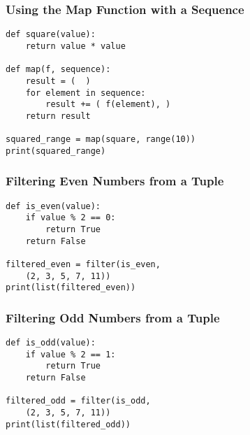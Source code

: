 \documentclass[14pt,aspectratio=169]{beamer}
\begin{document}
%
\begin{frame}[fragile]
  \frametitle{Using the Map Function with a Sequence}
  \begin{minipage}{6in}
    \vspace*{.15in}
    \begin{verbatim}
def square(value):
    return value * value

def map(f, sequence):
    result = (  )
    for element in sequence:
        result += ( f(element), )
    return result

squared_range = map(square, range(10))
print(squared_range)
    \end{verbatim}
  \end{minipage}
\end{frame}

%
\begin{frame}[fragile]
  \frametitle{Filtering Even Numbers from a Tuple}
  \begin{minipage}{6in}
    \vspace*{.15in}
    \begin{verbatim}
def is_even(value):
    if value % 2 == 0:
        return True
    return False

filtered_even = filter(is_even,
    (2, 3, 5, 7, 11))
print(list(filtered_even))
    \end{verbatim}
  \end{minipage}
\end{frame}

%
\begin{frame}[fragile]
  \frametitle{Filtering Odd Numbers from a Tuple}
  \begin{minipage}{6in}
    \vspace*{.15in}
    \begin{verbatim}
def is_odd(value):
    if value % 2 == 1:
        return True
    return False

filtered_odd = filter(is_odd,
    (2, 3, 5, 7, 11))
print(list(filtered_odd))
    \end{verbatim}
  \end{minipage}
\end{frame}
\end{document}
